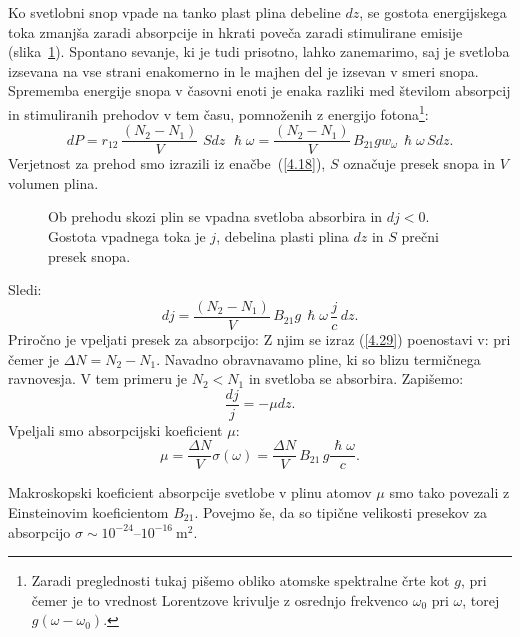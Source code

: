 Ko svetlobni snop vpade na tanko plast plina debeline $dz$, se gostota
energijskega toka zmanjša zaradi absorpcije in hkrati poveča zaradi 
stimulirane emisije (slika~\ref{fig:abs}). 
Spontano sevanje, ki je tudi prisotno, lahko zanemarimo, saj
je svetloba izsevana na vse strani enakomerno in le majhen del je izsevan v smeri snopa.
Sprememba energije snopa v časovni enoti je enaka razliki med 
številom absorpcij in stimuliranih prehodov v tem času, pomnoženih z 
energijo fotona\footnote{Zaradi preglednosti tukaj pišemo obliko atomske spektralne črte kot $g$, 
pri čemer je to vrednost Lorentzove krivulje z osrednjo frekvenco $\omega_0$ pri $\omega$, 
torej $g(\omega-\omega_0)$.}:
\begin{equation}
dP=r_{12}\,\frac{(N_{2}-N_{1})}{V}\,\,S dz\, \, \hslash\omega = 
\frac{(N_{2}-N_{1})}{V}\,B_{21}g w_{\omega} \, \hslash\omega \,S dz.
\label{4.28}
\end{equation}
Verjetnost za prehod smo izrazili iz enačbe~(\ref{4.18}),
$S$ označuje presek snopa in $V$ volumen plina. 
\begin{figure}[ht]
\centering
\def\svgwidth{70truemm} 

\caption{Ob prehodu skozi plin se vpadna svetloba absorbira in $dj < 0$. Gostota vpadnega
toka je $j$, debelina plasti plina $dz$ in $S$ prečni presek snopa.}
\label{fig:abs}
\end{figure}

Sledi:
\begin{equation}
dj=\frac{(N_{2}-N_{1})}{V}\, B_{21}g\, \hslash\omega\,\frac{j}{c}\, dz.
\label{4.29}
\end{equation}
Priročno je vpeljati presek za absorpcijo:
Z njim se izraz (\ref{4.29}) poenostavi v:
pri čemer je $\Delta N = N_{2}-N_{1}$.
Navadno obravnavamo pline, ki so blizu termičnega ravnovesja. V tem primeru 
je $N_{2}<N_{1}$ in svetloba se absorbira.
Zapišemo:
\begin{equation}
\frac{dj}{j} = -\mu dz.
\label{eq:jabs}
\end{equation}
Vpeljali smo absorpcijski koeficient $\mu$:
\begin{equation}
\mu=\frac{\Delta N}{V}\sigma(\omega)=
\frac{\Delta N}{V}\, B_{21}\, g\frac{\hslash\omega}{c}.
\label{eq:muabs1}
\end{equation}
 
Makroskopski koeficient absorpcije svetlobe v plinu atomov $\mu$ smo tako povezali
z Einsteinovim koefici\-entom $B_{21}$. Povejmo še, da so 
tipične velikosti presekov za absorpcijo $\sigma \sim 10^{-24}$--$10^{-16}~\si{\metre^2}$.

